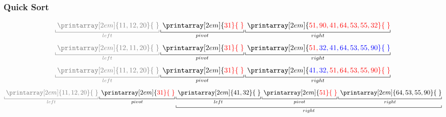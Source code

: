 \documentclass[newPxFont,sthlmFooter,nooffset]{beamer}
\begin{document}
\begin{frame}[t, fragile]
  \frametitle{Quick Sort}
\[
{\color{black!50}\underbracket[0.5pt]{{\thickspace}\printarray[2em]{11, 12, 20}{\thickspace}}_{left}}
\underbracket[0.5pt]{{\thickspace}\printarray[2em]{\color{red}31}{\thickspace}}_{pivot}
\underbracket[0.5pt]{{\thickspace}\printarray[2em]{\color{red}51, 90, 41, 64, 53, 55, 32}{\thickspace}}_{right}
\] \pause  
\[
{\color{black!50}\underbracket[0.5pt]{{\thickspace}\printarray[2em]{12, 11, 20}{\thickspace}}_{left}}
\underbracket[0.5pt]{{\thickspace}\printarray[2em]{\color{red}31}{\thickspace}}_{pivot}
\underbracket[0.5pt]{{\thickspace}\printarray[2em]{\color{red}51, \color{blue}32, 41, 64, 53, 55, \color{blue}90}{\thickspace}}_{right}
\] \pause  
\[
{\color{black!50}\underbracket[0.5pt]{{\thickspace}\printarray[2em]{11, 12, 20}{\thickspace}}_{left}}
\underbracket[0.5pt]{{\thickspace}\printarray[2em]{\color{red}31}{\thickspace}}_{pivot}
\underbracket[0.5pt]{{\thickspace}\printarray[2em]{\color{blue}41, 32, \color{red}51, 64, 53, 55, 90}{\thickspace}}_{right}
\] \pause  
\[
{\color{black!50}\underbracket[0.5pt]{{\thickspace}\printarray[2em]{11, 12, 20}{\thickspace}}_{left}}
\underbracket[0.5pt]{{\thickspace}\printarray[2em]{\color{red}31}{\thickspace}}_{pivot}
\underbracket[0.5pt]{
\underbracket[0.5pt]{{\thickspace}\printarray[2em]{41, 32}{\thickspace}}_{left} 
\underbracket[0.5pt]{{\thickspace}\printarray[2em]{\color{red}51}{\thickspace}}_{pivot}
\underbracket[0.5pt]{{\thickspace}\printarray[2em]{64, 53, 55, 90}{\thickspace}}_{right}
}_{right}
\]



\end{frame}
\end{document}
